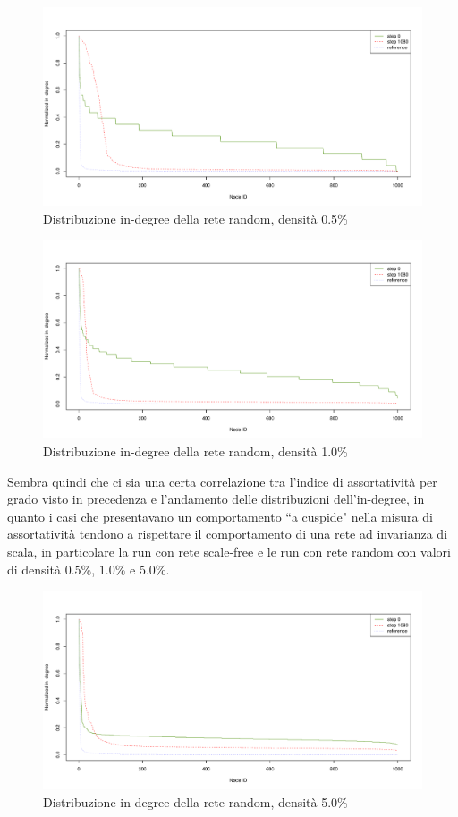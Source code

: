 \documentclass[a4paper,12pt]{article}
\begin{document}
\begin{figure}[H]
\centering
\includegraphics[scale=0.5]{images/dist_1000_rnd_1080_05_0.pdf}
\caption{Distribuzione in-degree della rete random, densità 0.5\%}
\end{figure}
\begin{figure}[h]
\centering
\includegraphics[scale=0.5]{images/dist_1000_rnd_1080_1_0.pdf}
\caption{Distribuzione in-degree della rete random, densità 1.0\%}
\end{figure}
Sembra quindi che ci sia una certa correlazione tra l'indice di assortatività per grado visto in precedenza e l'andamento delle distribuzioni dell'in-degree, in quanto i casi che presentavano un comportamento ``a cuspide" nella misura di assortatività tendono a rispettare il comportamento di una rete ad invarianza di scala, in particolare la run con rete scale-free e le run con rete random con valori di densità $0.5\%$, $1.0\%$ e $5.0\%$. 
\begin{figure}[H]
\centering
\includegraphics[scale=0.5]{images/dist_1000_rnd_1080_5_0.pdf}
\caption{Distribuzione in-degree della rete random, densità 5.0\%}
\end{figure}
\end{document}
